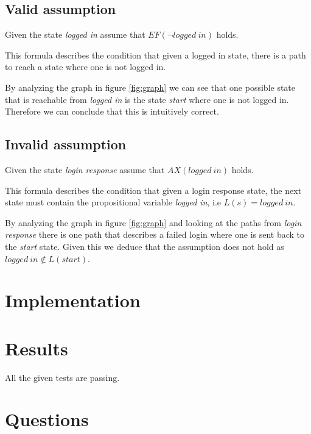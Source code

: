 \documentclass[a4paper,11pt]{article}
\begin{document}
\newpage
\subsection{Valid assumption}
Given the state \textit{logged in} assume that $EF(\neg logged \: in)$ holds.

This formula describes the condition that given a logged in state, there is a path
to reach a state where one is not logged in.

By analyzing the graph in figure \ref{fig:graph} we can see that one possible state that is reachable from
\textit{logged in} is the state \textit{start} where one is not logged in. Therefore we can conclude that this is intuitively correct.

\subsection{Invalid assumption}
Given the state \textit{login response} assume that $AX(logged \: in)$ holds.

This formula describes the condition that given a login response state, the next state must contain the propositional variable \textit{logged in}, i.e $L(s)=logged \: in$.

By analyzing the graph in figure \ref{fig:graph} and looking at the paths from \textit{login response} there is one path that describes a failed login where one is sent back to the \textit{start} state. Given this we deduce that the assumption does not hold as $logged \: in \notin L(start)$.

\section{Implementation}

\section{Results}
All the given tests are passing.

\section{Questions}


\end{document}
